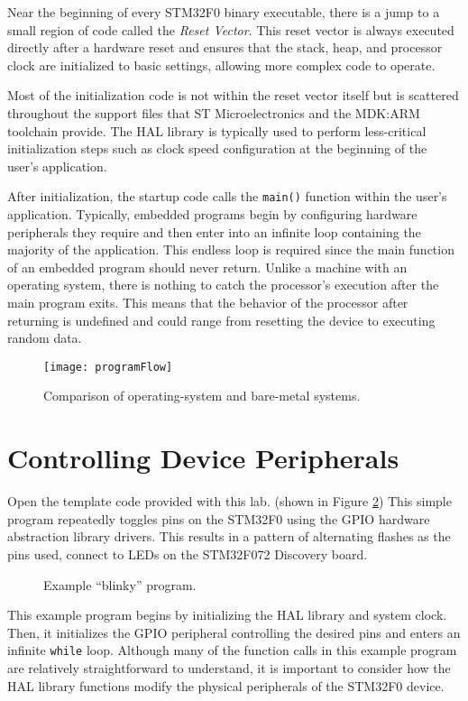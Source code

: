 \documentclass[11pt,fleqn]{book} %
\newcommand{\code}[3]{
    \begin{figure}[]
        \colorbox{gray!20!white}{
            \parbox{\linewidth-2\fboxsep} {
                \centering 
                
            }
        }
        \caption{#2}
        \label{#3}
    \end{figure}
}
\begin{document}
Near the beginning of every STM32F0 binary executable, there is a jump to a small region of code called the \textit{Reset Vector}. This reset vector is always executed directly after a hardware reset and ensures that the stack, heap, and processor clock are initialized to basic settings, allowing more complex code to operate.

Most of the initialization code is not within the reset vector itself but is scattered throughout the support files that ST Microelectronics and the MDK:ARM toolchain provide. The HAL library is typically used to perform less-critical initialization steps such as clock speed configuration at the beginning of the user's application. 

After initialization, the startup code calls the \texttt{main()} function within the user's application. Typically, embedded programs begin by configuring hardware peripherals they require and then enter into an infinite loop containing the majority of the application. This endless loop is required since the main function of an embedded program should never return. Unlike a machine with an operating system, there is nothing to catch the processor's execution after the main program exits. This means that the behavior of the processor after returning is undefined and could range from resetting the device to executing random data.

\begin{figure}[]
    \centering\texttt{[image: programFlow]}
    \caption{Comparison of operating-system and bare-metal systems. }
    \label{programFlow}
\end{figure}


\section{Controlling Device Peripherals}

Open the template code provided with this lab. (shown in Figure \ref{blinky}) This simple program repeatedly toggles pins on the STM32F0 using the GPIO hardware abstraction library drivers. This results in a pattern of alternating flashes as the pins used, connect to LEDs on the STM32F072 Discovery board. 
\code{./Files/blinky.c}{Example ``blinky'' program.}{blinky}

This example program begins by initializing the HAL library and system clock. Then, it initializes the GPIO peripheral controlling the desired pins and enters an infinite \texttt{while} loop. Although many of the function calls in this example program are relatively straightforward to understand, it is important to consider how the HAL library functions modify the physical peripherals of the STM32F0 device.
\end{document}
